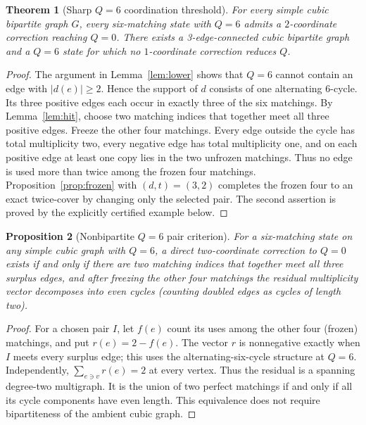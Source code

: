 \documentclass[11pt]{article}
\newtheorem{theorem}{Theorem}[section]
\newtheorem{proposition}[theorem]{Proposition}
\begin{document}
\begin{theorem}[Sharp $Q=6$ coordination threshold]\label{thm:two}
For every simple cubic bipartite graph $G$, every six-matching
state with $Q=6$ admits a $2$-coordinate correction reaching $Q=0$.
There exists a 3-edge-connected cubic bipartite graph and a $Q=6$
state for which no $1$-coordinate correction reduces $Q$.
\end{theorem}
\begin{proof}
The argument in Lemma~\ref{lem:lower} shows that $Q=6$ cannot
contain an edge with $|d(e)|\ge2$. Hence the support of $d$ consists
of one alternating 6-cycle. Its three positive edges each occur
in exactly three of the six matchings. By Lemma~\ref{lem:hit}, choose
two matching indices that together meet all three positive edges.
Freeze the other four matchings. Every edge outside the cycle has
total multiplicity two, every negative edge has total multiplicity
one, and on each positive edge at least one copy lies in the two
unfrozen matchings. Thus no edge is used more than twice among
the frozen four matchings. Proposition~\ref{prop:frozen} with
$(d,t)=(3,2)$ completes the frozen four to an exact twice-cover
by changing only the selected pair. The second assertion is proved
by the explicitly certified example below.
\end{proof}

\begin{proposition}[Nonbipartite $Q=6$ pair criterion]
For a six-matching state on any simple cubic graph with $Q=6$,
a direct two-coordinate correction to $Q=0$ exists if and only
if there are two matching indices that together meet all three
surplus edges, and after freezing the other four matchings the
residual multiplicity vector decomposes into even cycles
(counting doubled edges as cycles of length two).
\end{proposition}
\begin{proof}
For a chosen pair $I$, let $f(e)$ count its uses among the
other four (frozen) matchings, and put $r(e)=2-f(e)$.
The vector $r$ is nonnegative exactly when $I$ meets every
surplus edge; this uses the alternating-six-cycle structure
at $Q=6$. Independently, $\sum_{e\ni v}r(e)=2$ at every vertex.
Thus the residual is a spanning degree-two multigraph.
It is the union of two perfect matchings if and only if all
its cycle components have even length. This equivalence does
not require bipartiteness of the ambient cubic graph.
\end{proof}
\end{document}
